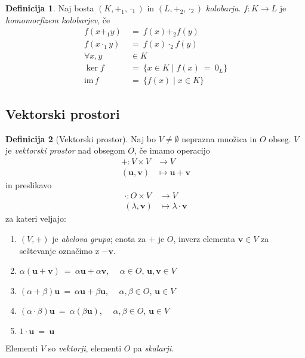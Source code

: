 \documentclass[11pt]{article}
\renewcommand{\u}{\mathbf{u}}
\newcommand{\vv}{\mathbf{v}}
\newcommand{\0}{\mathbf{0}}
\newcommand{\im}{\text{im}\,}
\newcommand{\K}{K}
\renewcommand{\L}{L}
\theoremstyle{definition}
\newtheorem{definicija}{Definicija}[section]
\theoremstyle{definition}
\theoremstyle{definition}
\theoremstyle{definition}
\begin{document}
\begin{definicija}

Naj bosta $(\K,+_1,\cdot_1)$ in $(\L,+_2,\cdot_2)$ \textit{kolobarja}. $f:\K\rightarrow\L$ je \textit{homomorfizem kolobarjev}, če
\begin{align*}
f(x +_1 y) ~&=~ f(x) +_2 f(y) \\
f(x \cdot_1 y) ~&=~ f(x) \cdot_2 f(y) \\
\forall x,y &\in \K \\
\ker f ~&=~ \{x \in \K \mid f(x) ~=~ 0_\L\} \\
\im f ~&=~ \{f(x) \mid x \in \K\}
\end{align*}

\end{definicija}
\vspace{0.5cm}


\subsection{Vektorski prostori}
\vspace{0.5cm}

\begin{definicija}[Vektorski prostor]

Naj bo $V \neq \emptyset$ neprazna množica in $O$ obseg. $V$ je \textit{vektorski prostor} nad obsegom $O$, če imamo operacijo
\begin{align*}
+: V \times V &\rightarrow V \\
(\u,\vv) &\mapsto \u + \vv
\end{align*}
in preslikavo
\begin{align*}
\cdot: O \times V &\rightarrow V \\
(\lambda, \vv) &\mapsto \lambda \cdot \vv
\end{align*}
za kateri veljajo:
\begin{enumerate}
	\item $(V,+)$ je \textit{abelova grupa}; enota za $+$ je $O$, inverz elementa $\vv \in V$ za seštevanje označimo z $-\vv$.
	\item $\alpha(\u+\vv) ~=~ \alpha\u + \alpha\vv$, ~~$\alpha \in O$, $\u,\vv \in V$
	\item $(\alpha + \beta)\u ~=~ \alpha\u + \beta\u$, ~~$\alpha,\beta \in O$, $\u \in V$
	\item $(\alpha \cdot \beta) \u ~=~ \alpha (\beta \u)$, ~~$\alpha,\beta \in O$, $\u \in V$
	\item $1 \cdot \u ~=~ \u$
\end{enumerate}
Elementi $V$ so \textit{vektorji}, elementi $O$ pa \textit{skalarji}.

\end{definicija}
\vspace{0.5cm}
\end{document}
